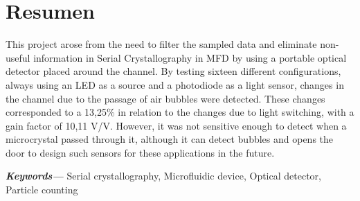 

\begingroup
\let\clearpage\relax
\let\cleardoublepage\relax
\let\cleardoublepage\relax




\chapter*{Resumen} %
 This project arose from the need to filter the sampled data and eliminate non-useful information in Serial Crystallography in \ac{MFD} by using a portable optical detector placed around the channel. By testing sixteen different configurations, always using an LED as a source and a photodiode as a light sensor, changes in the channel due to the passage of air bubbles were detected. These changes corresponded to a 13,25\% in relation to the changes due to light switching, with a gain factor of 10,11 V/V. However, it was not sensitive enough to detect when a microcrystal passed through it, although it can detect bubbles and opens the door to design such sensors for these applications in the future.

\endgroup
\providecommand{\keywords}[1]
{
	\small	
	\textbf{\textit{Keywords---}} #1
}			
\keywords{Serial crystallography, Microfluidic device, Optical detector, Particle counting}

\vfill